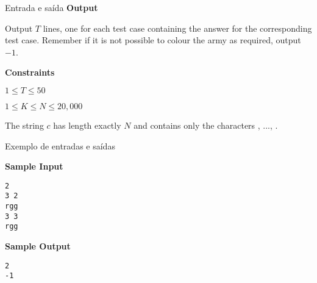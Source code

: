 \begin{frame}[fragile]{Entrada e saída}
\textbf{Output}

Output $T$ lines, one for each test case containing the answer for the corresponding test case. Remember if it is not possible to colour the army as required, output $-1$.

\vspace{0.2in}

\textbf{Constraints}

$1 \leq T \leq 50$

$1 \leq K \leq N \leq 20,000$

The string $c$ has length exactly $N$ and contains only the characters , ...,
.
 
\end{frame}

\begin{frame}[fragile]{Exemplo de entradas e saídas}

\begin{minipage}[t]{0.5\textwidth}
\textbf{Sample Input}
\begin{verbatim}
2
3 2
rgg
3 3
rgg
\end{verbatim}
\end{minipage}
\begin{minipage}[t]{0.45\textwidth}
\textbf{Sample Output}
\begin{verbatim}
2
-1
\end{verbatim}
\end{minipage}
\end{frame}

